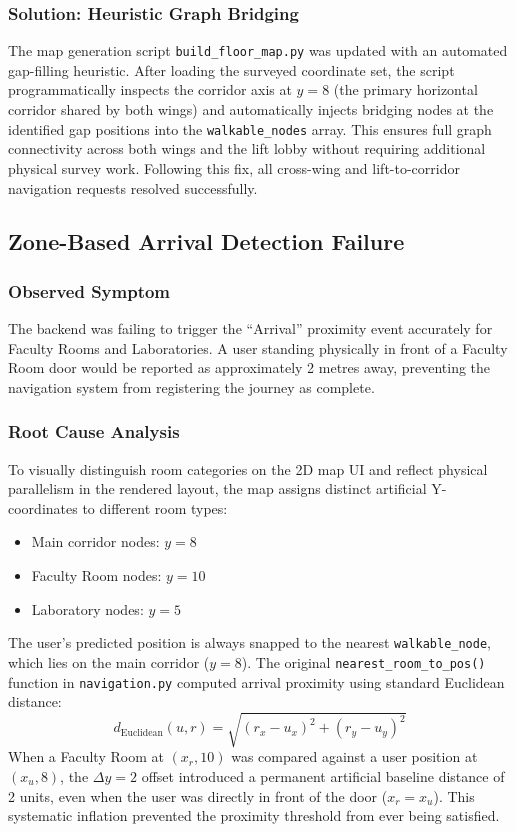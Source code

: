 \documentclass[11pt,a4paper]{article}
\begin{document}
\subsubsection{Solution: Heuristic Graph Bridging}
The map generation script \texttt{build\_floor\_map.py} was updated with an automated gap-filling heuristic. After loading the surveyed coordinate set, the script programmatically inspects the corridor axis at $y = 8$ (the primary horizontal corridor shared by both wings) and automatically injects bridging nodes at the identified gap positions into the \texttt{walkable\_nodes} array. This ensures full graph connectivity across both wings and the lift lobby without requiring additional physical survey work. Following this fix, all cross-wing and lift-to-corridor navigation requests resolved successfully.
\subsection{Zone-Based Arrival Detection Failure}
\subsubsection{Observed Symptom}
The backend was failing to trigger the ``Arrival'' proximity event accurately for Faculty Rooms and Laboratories. A user standing physically in front of a Faculty Room door would be reported as approximately 2 metres away, preventing the navigation system from registering the journey as complete.
\subsubsection{Root Cause Analysis}
To visually distinguish room categories on the 2D map UI and reflect physical parallelism in the rendered layout, the map assigns distinct artificial Y-coordinates to different room types:
\begin{itemize}
\item Main corridor nodes: $y = 8$
\item Faculty Room nodes: $y = 10$
\item Laboratory nodes: $y = 5$
\end{itemize}
The user's predicted position is always snapped to the nearest \texttt{walkable\_node}, which lies on the main corridor ($y = 8$). The original \texttt{nearest\_room\_to\_pos()} function in \texttt{navigation.py} computed arrival proximity using standard Euclidean distance:
\begin{equation}
d_{\text{Euclidean}}(u, r) = \sqrt{(r_x - u_x)^2 + (r_y - u_y)^2}
\end{equation}
When a Faculty Room at $(x_r, 10)$ was compared against a user position at $(x_u, 8)$, the $\Delta y = 2$ offset introduced a permanent artificial baseline distance of 2 units, even when the user was directly in front of the door ($x_r = x_u$). This systematic inflation prevented the proximity threshold from ever being satisfied.
\end{document}
